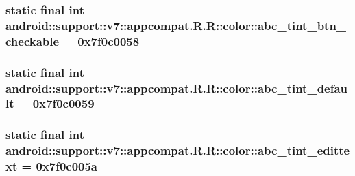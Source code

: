 \hypertarget{classandroid_1_1support_1_1v7_1_1appcompat_1_1_r_1_1color_3da34872aca323cf4301da0914ba4977}{
\subsubsection[{abc\_\-tint\_\-btn\_\-checkable}]{\setlength{\rightskip}{0pt plus 5cm}static final int android::support::v7::appcompat.R.R::color::abc\_\-tint\_\-btn\_\-checkable = 0x7f0c0058}}
\label{classandroid_1_1support_1_1v7_1_1appcompat_1_1_r_1_1color_3da34872aca323cf4301da0914ba4977}


\hypertarget{classandroid_1_1support_1_1v7_1_1appcompat_1_1_r_1_1color_12528c7f2f11834c3d434d77a0b87049}{
\subsubsection[{abc\_\-tint\_\-default}]{\setlength{\rightskip}{0pt plus 5cm}static final int android::support::v7::appcompat.R.R::color::abc\_\-tint\_\-default = 0x7f0c0059}}
\label{classandroid_1_1support_1_1v7_1_1appcompat_1_1_r_1_1color_12528c7f2f11834c3d434d77a0b87049}


\hypertarget{classandroid_1_1support_1_1v7_1_1appcompat_1_1_r_1_1color_951015fadcc9535bbcbff7bd3b735d49}{
\subsubsection[{abc\_\-tint\_\-edittext}]{\setlength{\rightskip}{0pt plus 5cm}static final int android::support::v7::appcompat.R.R::color::abc\_\-tint\_\-edittext = 0x7f0c005a}}
\label{classandroid_1_1support_1_1v7_1_1appcompat_1_1_r_1_1color_951015fadcc9535bbcbff7bd3b735d49}


